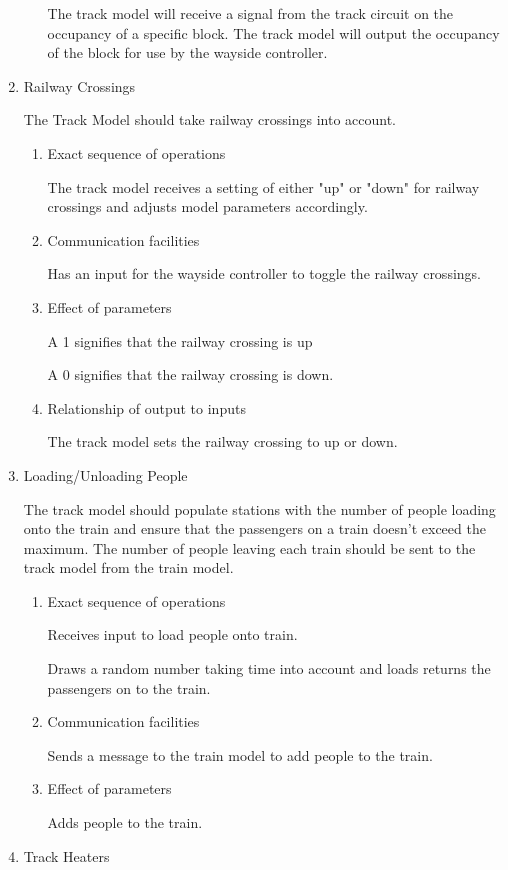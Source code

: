 \documentclass[11pt]{article}
\begin{document}
\begin{enumerate}
\begin{enumerate}
The track model will receive a signal from the track circuit on the occupancy of a specific block. The track model will output the occupancy of the block for use by the wayside controller.
\end{enumerate}
\item Railway Crossings
\label{sec-3-1-3-7}

The Track Model should take railway crossings into account.
\begin{enumerate}
\item Exact sequence of operations
\label{sec-3-1-3-7-1}

The track model receives a setting of either "up" or "down" for railway crossings and adjusts model parameters accordingly.
\item Communication facilities
\label{sec-3-1-3-7-2}

Has an input for the wayside controller to toggle the railway crossings.
\item Effect of parameters
\label{sec-3-1-3-7-3}

A 1 signifies that the railway crossing is up

A 0 signifies that the railway crossing is down.
\item Relationship of output to inputs
\label{sec-3-1-3-7-4}

The track model sets the railway crossing to up or down.
\end{enumerate}
\item Loading/Unloading People
\label{sec-3-1-3-8}

The track model should populate stations with the number of people loading onto the train and ensure that the passengers on a train doesn't exceed the maximum.
The number of people leaving each train should be sent to the track model from the train model.
\begin{enumerate}
\item Exact sequence of operations
\label{sec-3-1-3-8-1}

Receives input to load people onto train.

Draws a random number taking time into account  and loads returns the passengers on to the train.
\item Communication facilities
\label{sec-3-1-3-8-2}

Sends a message to the train model to add people to the train.
\item Effect of parameters
\label{sec-3-1-3-8-3}

Adds people to the train.
\end{enumerate}
\item Track Heaters
\label{sec-3-1-3-9}


\end{enumerate}
\end{document}
